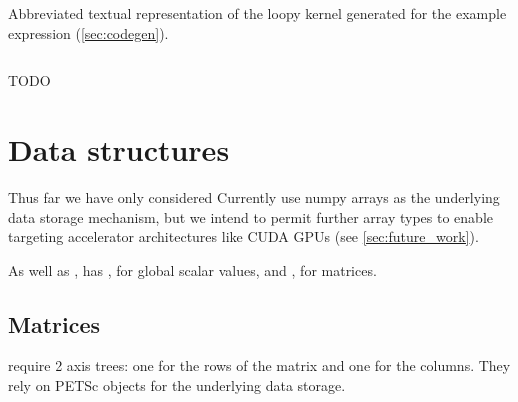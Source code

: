\documentclass[thesis]{subfiles}
\begin{document}
\begin{example}

\begin{listing}
  \centering
  \begin{minipage}{.8\textwidth}
    \inputminted{text}{./scripts/artefacts/codegen_example_loopy_kernel_tidy.txt}
  \end{minipage}
  \caption{
    Abbreviated textual representation of the loopy kernel generated for the example expression (\cref{sec:codegen}).
  }
  \label{listing:loopy_kernel_ex2}
\end{listing}

\begin{listing}
  \centering
  \begin{minipage}{.8\textwidth}
    \inputminted{c}{./scripts/artefacts/codegen_example_c_code_tidy.c}
  \end{minipage}
  \caption{
    TODO
  }
  \label{lst:codegen_example_c_code}
\end{listing}


\end{example}

\section{Data structures}
\label{sec:data_structures}

Thus far we have only considered
Currently  use numpy arrays as the underlying data storage mechanism, but we intend to permit further array types to enable targeting accelerator architectures like CUDA GPUs (see \cref{sec:future_work}).

As well as ,  has , for global scalar values, and , for matrices.

\subsection{Matrices}


 require 2 axis trees: one for the rows of the matrix and one for the columns.
They rely on PETSc  objects for the underlying data storage.
\end{document}
